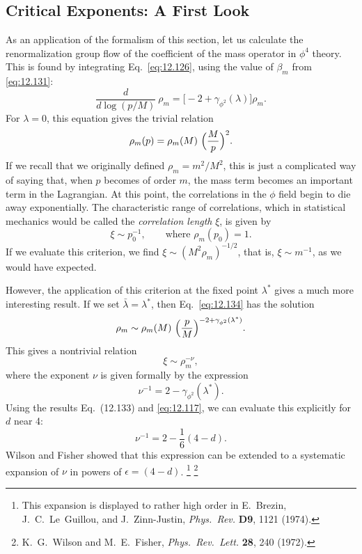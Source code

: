 \subsection{Critical Exponents: A First Look}

As an application of the formalism of this section, let us calculate the
renormalization group flow of the coefficient of the mass operator in
$\phi^4$ theory.  This is found by integrating Eq.~\eqref{eq:12.126}, using
the value of $\beta_m$ from \eqref{eq:12.131}:
\begin{equation}
  \frac{d}{d\log(p/M)}\ \rho_m = \bigl[ -2 + \gamma_{\phi^2}(\lambda) \bigr]
    \rho_m .
  \label{eq:12.134}
\end{equation}
For $\lambda = 0$, this equation gives the trivial relation
\begin{equation}
  \rho_m(p) = \rho_m(M)\ \Bigl( \frac{M}{p} \Bigr)^2 .
  \label{eq:12.135}
\end{equation}
If we recall that we originally defined $\rho_m = m^2/M^2$, this is just a
complicated way of saying that, when $p$ becomes of order $m$, the mass term
becomes an important term in the Lagrangian.  At this point, the correlations
in the $\phi$ field begin to die away exponentially.  The characteristic range
of correlations, which in statistical mechanics would be called the
\emph{correlation length} $\xi$, is given by
\begin{equation}
  \xi \sim p_0^{-1},
  \qquad\text{where } \rho_m(p_0) = 1 .
  \label{eq:12.136}
\end{equation}
If we evaluate this criterion, we find $\xi \sim (M^2\rho_m)^{-1/2}$, that is,
$\xi \sim m^{-1}$, as we would have expected.

However, the application of this criterion at the fixed point $\lambda^{*}$
gives a much more interesting result.  If we set $\bar{\lambda} =
\lambda^{*}$, then Eq.~\eqref{eq:12.134} has the solution
\begin{equation}
  \rho_m \sim \rho_m(M)\ \Bigl( \frac{p}{M} \Bigr)^{-2 +
    \gamma_{\phi^2}(\lambda^{*})} .
  \label{eq:12.137}
\end{equation}
This gives a nontrivial relation
\begin{equation}
  \xi \sim \rho_m^{-\nu} ,
  \label{eq:12.138}
\end{equation}
where the exponent $\nu$ is given formally by the expression
\begin{equation}
  \nu^{-1} = 2 - \gamma_{\phi^2}(\lambda^{*}) .
  \label{eq:12.139}
\end{equation}
Using the results Eq.~(12.133) and \eqref{eq:12.117}, we can evaluate
this explicitly for $d$ near 4:
\begin{equation}
  \nu^{-1} = 2 - \frac{1}{6}(4-d) .
  \label{eq:12.140}
\end{equation}
Wilson and Fisher showed that this expression can be extended to a systematic
expansion of $\nu$ in powers of $\epsilon = (4-d)$.%
\footnote{This expansion is displayed to rather high order in E.~Brezin,
J.~C.~Le~Guillou, and J.~Zinn-Justin, \emph{Phys.\ Rev.} \textbf{D9}, 1121
(1974).}%
\footnote{K.~G.~Wilson and M.~E.~Fisher, \emph{Phys.\ Rev.\ Lett.} \textbf{28},
240 (1972).}

